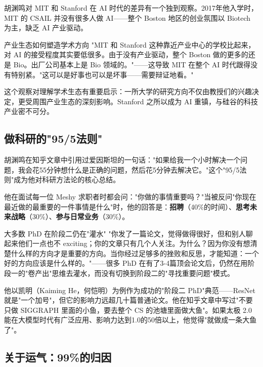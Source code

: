 \documentclass[a4paper]{article}
\begin{document}
胡渊鸣对 MIT 和 Stanford 在 AI 时代的差异有一个独到观察。2017年他入学时，MIT 的 CSAIL 并没有很多人做 AI——整个 Boston 地区的创业氛围以 Biotech 为主，缺乏 AI 产业驱动。

\begin{knowledgebox}{产业生态如何塑造学术方向}
"MIT 和 Stanford 这种靠近产业中心的学校比起来，对 AI 的接受程度其实要低很多。由于没有产业驱动，整个 Boston 做的更多的还是 Bio。出厂公司基本上是 Bio 领域的。"——这导致 MIT 在整个 AI 时代跟得没有特别紧。"这可以是好事也可以是坏事——需要辩证地看。"
\end{knowledgebox}

这个观察对理解学术生态有重要启示：一所大学的研究方向不仅由教授们的兴趣决定，更受周围产业生态的深刻影响。Stanford 之所以成为 AI 重镇，与硅谷的科技产业密不可分。

\subsection{做科研的"95/5法则"}

胡渊鸣在知乎文章中引用过爱因斯坦的一句话："如果给我一个小时解决一个问题，我会花55分钟想什么是正确的问题，然后花5分钟去解决它。"这个"95/5法则"成为他对科研方法论的核心总结。

他在面试每一位 Meshy 求职者时都会问："你做的事情重要吗？"当被反问"你现在最近做的最重要的一件事情是什么"时，他的回答是：\textbf{招聘}（40\%的时间）、\textbf{思考未来战略}（30\%）、\textbf{参与日常业务}（30\%）。

\begin{warningbox}{大多数 PhD 在阶段二仍在"灌水"}
"你发了一篇论文，觉得做得很好，但和别人聊起来他们一点也不 exciting；你的文章只有几个人关注。为什么？因为你没有想清楚什么样的方向才是重要的方向。当你经过足够多的挫败和反思，才能知道：一个好的方向应该是什么样的。"——很多 PhD 在有了3-4篇顶会论文后，仍然在用阶段一的"卷产出"思维去灌水，而没有切换到阶段二的"寻找重要问题"模式。
\end{warningbox}

他以凯明（Kaiming He，何恺明）为例作为成功的"阶段二 PhD"典范——ResNet 就是"一个加号"，但它的影响力远超几十篇普通论文。他在知乎文章中写过"不要只做 SIGGRAPH 里面的小鱼，要去整个 CS 的池塘里面做大鱼"。如果太极 2.0 能在大模型时代有广泛应用、影响力达到1.0的50倍以上，他觉得"就做成一条大鱼了"。

\subsection{关于运气：99\%的归因}
\end{document}
